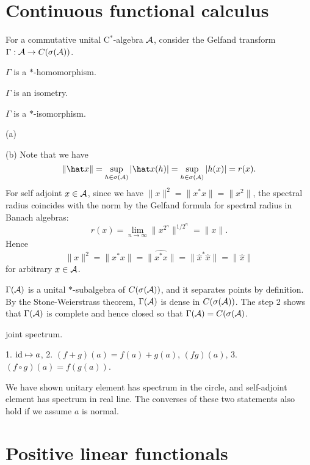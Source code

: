 \documentclass{../note}
\begin{document}
\section{Continuous functional calculus}

\begin{prb}
For a commutative unital C$^*$-algebra $\mathcal{A}$, consider the Gelfand transform $\Gamma:\mathcal{A}\to C(\sigma(\mathcal{A}))$.
\begin{parts}
\item $\Gamma$ is a $*$-homomorphism.
\item $\Gamma$ is an isometry.
\item $\Gamma$ is a $*$-isomorphism.
\end{parts}
\end{prb}
\begin{pf}
(a)

(b)
Note that we have
\[\|\hat x\|=\sup_{h\in\sigma(\cA)}|\hat x(h)|=\sup_{h\in\sigma(\cA)}|h(x)|=r(x).\]
For self adjoint $x\in\mathcal{A}$, since we have $\|x\|^2=\|x^*x\|=\|x^2\|$, the spectral radius coincides with the norm by the Gelfand formula for spectral radius in Banach algebras:
\[r(x)=\lim_{n\to\infty}\|x^{2^n}\|^{1/2^n}=\|x\|.\]
Hence
\[\|x\|^2=\|x^*x\|=\|\hat{x^*x}\|=\|\hat{x}^*\hat{x}\|=\|\hat{x}\|\]
for arbitrary $x\in\mathcal{A}$.


$\Gamma(\mathcal{A})$ is a unital $*$-subalgebra of $C(\sigma(\mathcal{A}))$, and it separates points by definition.
By the Stone-Weierstrass theorem, $\Gamma(\mathcal{A})$ is dense in $C(\sigma(\mathcal{A}))$.
The step 2 shows that $\Gamma(\mathcal{A})$ is complete and hence closed so that $\Gamma(\mathcal{A})=C(\sigma(\mathcal{A})$.
\end{pf}



\begin{prb}
joint spectrum.
\end{prb}


\begin{prb}
1. $\operatorname{id}\mapsto a$, 2. $(f+g)(a)=f(a)+g(a)$, $(fg)(a)$, 3. $(f\circ g)(a)=f(g(a))$.
\end{prb}


We have shown unitary element has spectrum in the circle, and self-adjoint element has spectrum in real line. The converses of these two statements also hold if we assume $a$ is normal.




\section{Positive linear functionals}
\end{document}
